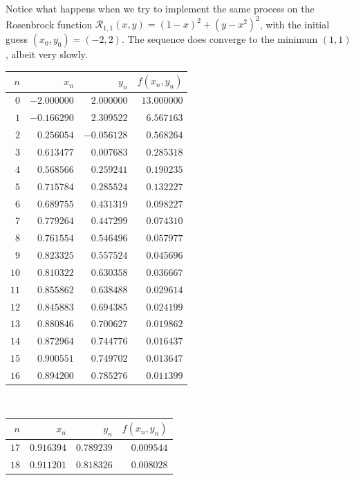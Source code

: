 \begin{example}\label{example:SDR}
Notice what happens when we try to implement the same process on the Rosenbrock function $\mathcal{R}_{1,1}(x,y) = (1-x)^2 + (y-x^2)^2$, with the initial guess $(x_0, y_0) = (-2,2)$.  The sequence does converge to the minimum $(1,1)$, albeit very slowly.
\begin{center}
\begin{tabular}{|r|r|r|r|} \hline 
 $n$ & $x_n$ & $y_n$ & $f(x_n,y_n)$ \\ \hline \hline 
$0$ & $-2.000000$ & $2.000000$ & $13.000000$ \\ \hline 
$1$ & $-0.166290$ & $2.309522$ & $6.567163$ \\ \hline 
$2$ & $0.256054$ & $-0.056128$ & $0.568264$ \\ \hline 
$3$ & $0.613477$ & $0.007683$ & $0.285318$ \\ \hline 
$4$ & $0.568566$ & $0.259241$ & $0.190235$ \\ \hline 
$5$ & $0.715784$ & $0.285524$ & $0.132227$ \\ \hline 
$6$ & $0.689755$ & $0.431319$ & $0.098227$ \\ \hline 
$7$ & $0.779264$ & $0.447299$ & $0.074310$ \\ \hline 
$8$ & $0.761554$ & $0.546496$ & $0.057977$ \\ \hline 
$9$ & $0.823325$ & $0.557524$ & $0.045696$ \\ \hline 
$10$ & $0.810322$ & $0.630358$ & $0.036667$ \\ \hline 
$11$ & $0.855862$ & $0.638488$ & $0.029614$ \\ \hline 
$12$ & $0.845883$ & $0.694385$ & $0.024199$ \\ \hline 
$13$ & $0.880846$ & $0.700627$ & $0.019862$ \\ \hline 
$14$ & $0.872964$ & $0.744776$ & $0.016437$ \\ \hline 
$15$ & $0.900551$ & $0.749702$ & $0.013647$ \\ \hline 
$16$ & $0.894200$ & $0.785276$ & $0.011399$ \\ \hline 
\end{tabular}~\begin{tabular}{|r|r|r|r|} \hline
 $n$ & $x_n$ & $y_n$ & $f(x_n,y_n)$ \\ \hline \hline 
$17$ & $0.916394$ & $0.789239$ & $0.009544$ \\ \hline 
$18$ & $0.911201$ & $0.818326$ & $0.008028$ \\ \hline 

\end{tabular}
\end{center}
\end{example}

